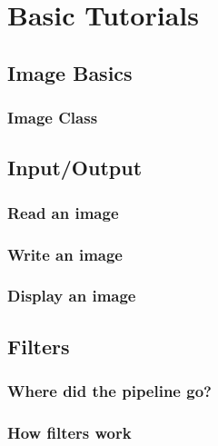 \section{Basic Tutorials}

\subsection{Image Basics}
\begin{frame}
\frametitle{Image Class}
\end{frame}


\subsection{Input/Output}

\begin{frame}
\frametitle{Read an image}
\end{frame}

\begin{frame}
\frametitle{Write an image}
\end{frame}

\begin{frame}
\frametitle{Display an image}
\end{frame}

\subsection{Filters}

\begin{frame}
\frametitle{Where did the pipeline go?}
\end{frame}

\begin{frame}
\frametitle{How filters work}
\end{frame}




